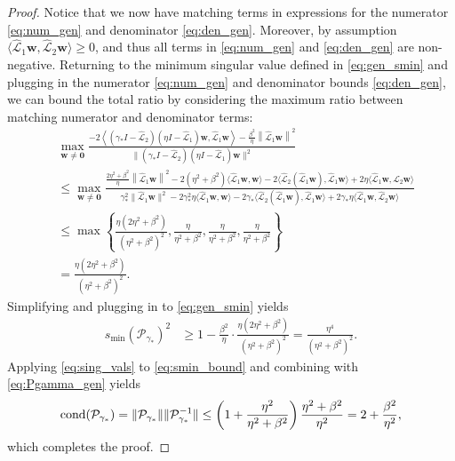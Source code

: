 \documentclass[review]{siamart}
\begin{document}
\begin{proof}
Notice that we now have matching terms in expressions for the numerator \eqref{eq:num_gen}
and denominator \eqref{eq:den_gen}. Moreover, by assumption
$\langle\widehat{\mathcal{L}}_1\mathbf{w},\widehat{\mathcal{L}}_2\mathbf{w}\rangle\geq 0$,
and thus all terms in \eqref{eq:num_gen} and \eqref{eq:den_gen} are non-negative.
Returning to the minimum singular value defined in \eqref{eq:gen_smin} and plugging in
the numerator \eqref{eq:num_gen} and denominator bounds \eqref{eq:den_gen}, we can
bound the total ratio by considering the maximum ratio between matching numerator
and denominator terms:
%
{\small
\begin{align}\nonumber
&\max_{\mathbf{w}\neq\mathbf{0}}
	\frac{-2\left\langle(\gamma_* I- \widehat{\mathcal{L}}_2)(\eta I- \widehat{\mathcal{L}}_1)\mathbf{w},
		\widehat{\mathcal{L}}_1\mathbf{w} \right\rangle-
		\frac{\beta^2}{\eta}\left\|\widehat{\mathcal{L}}_1\mathbf{w} \right\|^2}
	{\|(\gamma_* I- \widehat{\mathcal{L}}_2)(\eta I- \widehat{\mathcal{L}}_1)\mathbf{w}\|^2} \\
& \leq \max_{\mathbf{w}\neq\mathbf{0}}
	\frac{\frac{2\eta^2+\beta^2}{\eta}
			\left\|\widehat{\mathcal{L}}_1\mathbf{w} \right\|^2
		- 2(\eta^2+\beta^2)\langle \widehat{\mathcal{L}}_1\mathbf{w},\mathbf{w}\rangle
		- 2\langle\widehat{\mathcal{L}}_2(\widehat{\mathcal{L}}_1\mathbf{w}),\widehat{\mathcal{L}}_1\mathbf{w}\rangle
		+ 2\eta\langle\widehat{\mathcal{L}}_1\mathbf{w},\widehat{\mathcal{L}}_2\mathbf{w}\rangle
		}
	{\gamma_*^2\|\widehat{\mathcal{L}}_1\mathbf{w}\|^2
	- 2\gamma_*^2\eta\langle \widehat{\mathcal{L}}_1 \mathbf{w}, \mathbf{w}\rangle
	- 2\gamma_*\langle \widehat{\mathcal{L}}_2(\widehat{\mathcal{L}}_1\mathbf{w}),
		\widehat{\mathcal{L}}_1\mathbf{w}\rangle
	+ 2\gamma_*\eta\langle\widehat{\mathcal{L}}_1\mathbf{w},\widehat{\mathcal{L}}_2\mathbf{w}\rangle}
	\nonumber\\
& \leq \max \left\{ \frac{\eta(2\eta^2+\beta^2)}{(\eta^2+\beta^2)^2}, \frac{\eta}{\eta^2+\beta^2},
	\frac{\eta}{\eta^2+\beta^2}, \frac{\eta}{\eta^2+\beta^2}\right\} \nonumber \\
& = \frac{\eta(2\eta^2+\beta^2)}{(\eta^2+\beta^2)^2}.\label{eq:max_bound}
\end{align}
}
%
Simplifying and plugging in to \eqref{eq:gen_smin} yields
%
\begin{align}\label{eq:smin_bound}
s_{\min}(\mathcal{P}_{\gamma_*})^2 &\geq 1 - \frac{\beta^2}{\eta} \cdot
	\frac{\eta(2\eta^2+\beta^2)}{(\eta^2+\beta^2)^2}
= \frac{\eta^4}{(\eta^2+\beta^2)^2}.
\end{align}
%
Applying \eqref{eq:sing_vals} to \eqref{eq:smin_bound} and
combining with \eqref{eq:Pgamma_gen} yields
%
\begin{align}
\textnormal{cond}(\mathcal{P}_{\gamma_*}) = \|\mathcal{P}_{\gamma_*}\|\|\mathcal{P}_{\gamma_*}^{-1}\|
	\leq \left(1+\frac{\eta^2}{\eta^2+\beta^2}\right)\frac{\eta^2+\beta^2}{\eta^2}
	= 2+\frac{\beta^2}{\eta^2},
\end{align}
%
which completes the proof.
\end{proof}
%
\end{document}
